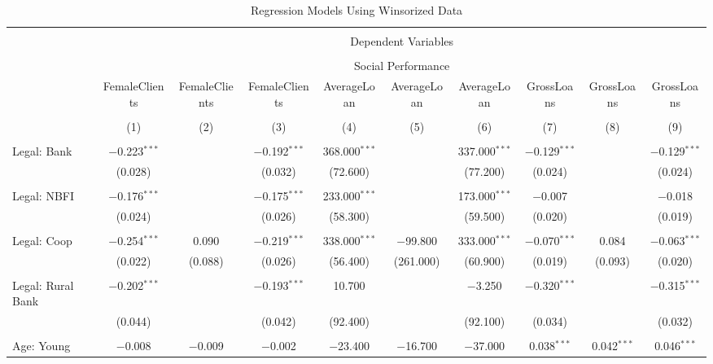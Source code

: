 \documentclass[a4paper,nobind]{templates/ociamthesis}
\begin{document}
\begin{landscape}
\begin{table}[!htbp] \centering 
  \caption{Regression Models Using Winsorized Data} 
  \label{} 
\footnotesize 
\begin{tabular}{@{\extracolsep{5pt}}lccccccccc} 
\\[-1.8ex]\hline 
\hline \\[-1.8ex] 
 & \multicolumn{9}{c}{Dependent Variables} \\ 
\cline{2-10} 
\\[-1.8ex] & \multicolumn{9}{c}{Social Performance} \\ 
 & FemaleClients & FemaleClients & FemaleClients & AverageLoan & AverageLoan & AverageLoan & GrossLoans & GrossLoans & GrossLoans \\ 
\\[-1.8ex] & (1) & (2) & (3) & (4) & (5) & (6) & (7) & (8) & (9)\\ 
\hline \\[-1.8ex] 
 Legal: Bank & $-$0.223$^{***}$ &  & $-$0.192$^{***}$ & 368.000$^{***}$ &  & 337.000$^{***}$ & $-$0.129$^{***}$ &  & $-$0.129$^{***}$ \\ 
  & (0.028) &  & (0.032) & (72.600) &  & (77.200) & (0.024) &  & (0.024) \\ 
  & & & & & & & & & \\ 
 Legal: NBFI & $-$0.176$^{***}$ &  & $-$0.175$^{***}$ & 233.000$^{***}$ &  & 173.000$^{***}$ & $-$0.007 &  & $-$0.018 \\ 
  & (0.024) &  & (0.026) & (58.300) &  & (59.500) & (0.020) &  & (0.019) \\ 
  & & & & & & & & & \\ 
 Legal: Coop & $-$0.254$^{***}$ & 0.090 & $-$0.219$^{***}$ & 338.000$^{***}$ & $-$99.800 & 333.000$^{***}$ & $-$0.070$^{***}$ & 0.084 & $-$0.063$^{***}$ \\ 
  & (0.022) & (0.088) & (0.026) & (56.400) & (261.000) & (60.900) & (0.019) & (0.093) & (0.020) \\ 
  & & & & & & & & & \\ 
 Legal: Rural Bank & $-$0.202$^{***}$ &  & $-$0.193$^{***}$ & 10.700 &  & $-$3.250 & $-$0.320$^{***}$ &  & $-$0.315$^{***}$ \\ 
  & (0.044) &  & (0.042) & (92.400) &  & (92.100) & (0.034) &  & (0.032) \\ 
  & & & & & & & & & \\ 
 Age: Young & $-$0.008 & $-$0.009 & $-$0.002 & $-$23.400 & $-$16.700 & $-$37.000 & 0.038$^{***}$ & 0.042$^{***}$ & 0.046$^{***}$ \\ 

\end{tabular}
\end{table}
\end{landscape}
\end{document}
